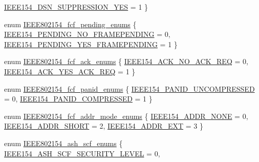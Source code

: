 \begin{DoxyCompactItemize}
\hyperlink{group___i_e_e_e802154_ggaec0a87fb4c8f6028b4b45819bf28c488a5768657f88c72a6793e895f7bac115b1}{I\+E\+E\+E154\+\_\+\+D\+S\+N\+\_\+\+S\+U\+P\+P\+R\+E\+S\+S\+I\+O\+N\+\_\+\+Y\+ES} = 1
 \}
\item 
enum \hyperlink{group___i_e_e_e802154_gad08eb2bfa77548cf453f93a31108b236}{I\+E\+E\+E802154\+\_\+fcf\+\_\+pending\+\_\+enums} \{ \hyperlink{group___i_e_e_e802154_ggad08eb2bfa77548cf453f93a31108b236adb0a4b8e09242fabc74f533c7d775ef5}{I\+E\+E\+E154\+\_\+\+P\+E\+N\+D\+I\+N\+G\+\_\+\+N\+O\+\_\+\+F\+R\+A\+M\+E\+P\+E\+N\+D\+I\+NG} = 0, 
\hyperlink{group___i_e_e_e802154_ggad08eb2bfa77548cf453f93a31108b236ae7142da7fbbce978f97395d5f0d869e2}{I\+E\+E\+E154\+\_\+\+P\+E\+N\+D\+I\+N\+G\+\_\+\+Y\+E\+S\+\_\+\+F\+R\+A\+M\+E\+P\+E\+N\+D\+I\+NG} = 1
 \}
\item 
enum \hyperlink{group___i_e_e_e802154_ga6c211670d51d0c879dc41f979b722321}{I\+E\+E\+E802154\+\_\+fcf\+\_\+ack\+\_\+enums} \{ \hyperlink{group___i_e_e_e802154_gga6c211670d51d0c879dc41f979b722321a96c54dd5c177170d74a81edda58701bf}{I\+E\+E\+E154\+\_\+\+A\+C\+K\+\_\+\+N\+O\+\_\+\+A\+C\+K\+\_\+\+R\+EQ} = 0, 
\hyperlink{group___i_e_e_e802154_gga6c211670d51d0c879dc41f979b722321a84ec81c08d1c44a5ffb084829cd4dd0c}{I\+E\+E\+E154\+\_\+\+A\+C\+K\+\_\+\+Y\+E\+S\+\_\+\+A\+C\+K\+\_\+\+R\+EQ} = 1
 \}
\item 
enum \hyperlink{group___i_e_e_e802154_gabe4e265cc3262eb7a5af5833c522c862}{I\+E\+E\+E802154\+\_\+fcf\+\_\+panid\+\_\+enums} \{ \hyperlink{group___i_e_e_e802154_ggabe4e265cc3262eb7a5af5833c522c862a0e9bc9d680874701afe9dde9061813ab}{I\+E\+E\+E154\+\_\+\+P\+A\+N\+I\+D\+\_\+\+U\+N\+C\+O\+M\+P\+R\+E\+S\+S\+ED} = 0, 
\hyperlink{group___i_e_e_e802154_ggabe4e265cc3262eb7a5af5833c522c862a804828c547ae620598af65a0bc086ab7}{I\+E\+E\+E154\+\_\+\+P\+A\+N\+I\+D\+\_\+\+C\+O\+M\+P\+R\+E\+S\+S\+ED} = 1
 \}
\item 
enum \hyperlink{group___i_e_e_e802154_ga314e581cc0876d8c2b88de39bdda6dcd}{I\+E\+E\+E802154\+\_\+fcf\+\_\+addr\+\_\+mode\+\_\+enums} \{ \hyperlink{group___i_e_e_e802154_gga314e581cc0876d8c2b88de39bdda6dcda65b4e06174a1e9c4d39571ddf1aba139}{I\+E\+E\+E154\+\_\+\+A\+D\+D\+R\+\_\+\+N\+O\+NE} = 0, 
\hyperlink{group___i_e_e_e802154_gga314e581cc0876d8c2b88de39bdda6dcda7d1efc7fcb39042d90c2fe1371cdf42b}{I\+E\+E\+E154\+\_\+\+A\+D\+D\+R\+\_\+\+S\+H\+O\+RT} = 2, 
\hyperlink{group___i_e_e_e802154_gga314e581cc0876d8c2b88de39bdda6dcda35c19400ee2496ea1dbb77d3b09e7a7c}{I\+E\+E\+E154\+\_\+\+A\+D\+D\+R\+\_\+\+E\+XT} = 3
 \}
\item 
enum \hyperlink{group___i_e_e_e802154_ga14bfc1b026f797e3faedb39d557df3c2}{I\+E\+E\+E802154\+\_\+ash\+\_\+scf\+\_\+enums} \{ \hyperlink{group___i_e_e_e802154_gga14bfc1b026f797e3faedb39d557df3c2ae9c8718341b4e86fc5b0d48a9e79e6ac}{I\+E\+E\+E154\+\_\+\+A\+S\+H\+\_\+\+S\+C\+F\+\_\+\+S\+E\+C\+U\+R\+I\+T\+Y\+\_\+\+L\+E\+V\+EL} = 0, 

\end{DoxyCompactItemize}
